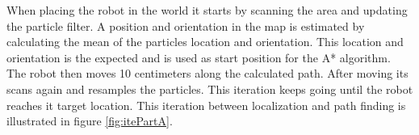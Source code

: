 \FloatBarrier
When placing the robot in the world it starts by scanning the area and updating the particle filter. A position and orientation in the map is estimated by calculating the mean of the particles location and orientation. This location and orientation is the expected and is used as start position for the A* algorithm. The robot then moves 10 centimeters along the calculated path. After moving its scans again and resamples the particles. This iteration keeps going until the robot reaches it target location. This iteration between localization and path finding is illustrated in figure \ref{fig:itePartA}. 



